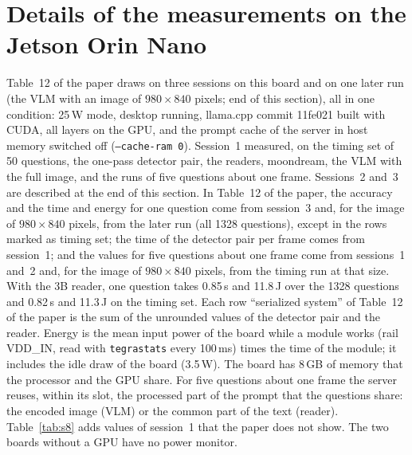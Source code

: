 \documentclass[10pt]{article}
\begin{document}
\section{Details of the measurements on the Jetson Orin Nano}
Table~12 of the paper draws on three sessions on this board and on one later run (the VLM with an image of $980\times840$ pixels; end of this section), all in one condition: 25\,W mode, desktop running, llama.cpp commit 11fe021 built with CUDA, all layers on the GPU, and the prompt cache of the server in host memory switched off (\texttt{--cache-ram 0}). Session~1 measured, on the timing set of 50 questions, the one-pass detector pair, the readers, moondream, the VLM with the full image, and the runs of five questions about one frame. Sessions~2 and~3 are described at the end of this section. In Table~12 of the paper, the accuracy and the time and energy for one question come from session~3 and, for the image of $980\times840$ pixels, from the later run (all 1328 questions), except in the rows marked as timing set; the time of the detector pair per frame comes from session~1; and the values for five questions about one frame come from sessions~1 and~2 and, for the image of $980\times840$ pixels, from the timing run at that size. With the 3B reader, one question takes 0.85\,s and 11.8\,J over the 1328 questions and 0.82\,s and 11.3\,J on the timing set. Each row ``serialized system'' of Table~12 of the paper is the sum of the unrounded values of the detector pair and the reader. Energy is the mean input power of the board while a module works (rail VDD\_IN, read with \texttt{tegrastats} every 100\,ms) times the time of the module; it includes the idle draw of the board (3.5\,W). The board has 8\,GB of memory that the processor and the GPU share. For five questions about one frame the server reuses, within its slot, the processed part of the prompt that the questions share: the encoded image (VLM) or the common part of the text (reader). Table~\ref{tab:s8} adds values of session~1 that the paper does not show. The two boards without a GPU have no power monitor.
\end{document}
